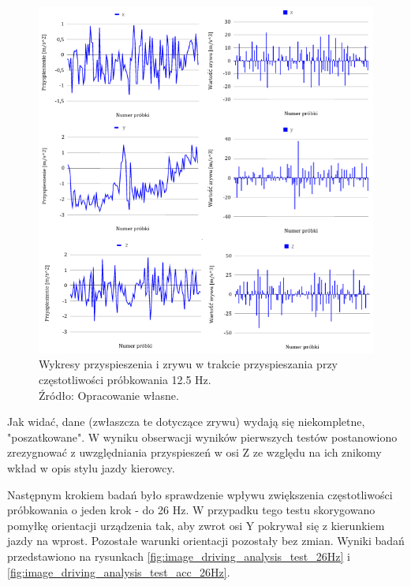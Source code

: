 \begin{figure}[H]
	\centering
	\includegraphics[width=12cm]{img/driving_analysis/12_5Hz_Przyspieszanie.png}
	\caption{Wykresy przyspieszenia i zrywu w trakcie przyspieszania przy częstotliwości próbkowania 12.5 Hz.
	\\Źródło: Opracowanie własne.}
	\label{fig:image_driving_analysis_test_12Hz}
\end{figure}

Jak widać, dane (zwłaszcza te dotyczące zrywu) wydają się niekompletne, "poszatkowane". W wyniku obserwacji wyników pierwszych testów postanowiono zrezygnować z uwzględniania przyspieszeń w osi Z ze względu na ich znikomy wkład w opis stylu jazdy kierowcy.

Następnym krokiem badań było sprawdzenie wpływu zwiększenia częstotliwości próbkowania o jeden krok - do 26 Hz. W przypadku tego testu skorygowano pomyłkę orientacji urządzenia tak, aby zwrot osi Y pokrywał się z kierunkiem jazdy na wprost. Pozostałe warunki orientacji pozostały bez zmian. Wyniki badań przedstawiono na rysunkach \ref{fig:image_driving_analysis_test_26Hz} i \ref{fig:image_driving_analysis_test_acc_26Hz}.

